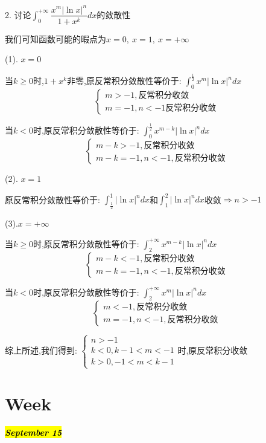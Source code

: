 2. 讨论$\int_{0}^{+\infty}\dfrac{x^m|\ln x|^n}{1+x^k}dx$的敛散性
\begin{solution}

	我们可知函数可能的暇点为$x=0,\ x=1,\ x=+\infty$
	
	(1). $x=0$
	
	当$k\geq 0$时,$1+x^{k}$非零,原反常积分敛散性等价于:  $\int_{0}^{\frac{1}{2}}x^{m}|\ln x|^ndx$
	$$\left\lbrace
	\begin{array}{l}
		m>-1,\text{反常积分收敛}\\
		m=-1,n<-1\text{反常积分收敛}
	\end{array}
	\right. $$
	
	当$k<0$时,原反常积分敛散性等价于:  $\int_{0}^{\frac{1}{2}}x^{m-k}|\ln x|^ndx$
	$$\left\lbrace
	\begin{array}{l}
		m-k>-1,\text{反常积分收敛}\\
		m-k=-1,n<-1,\text{反常积分收敛}
	\end{array}
	\right. $$
	
	(2). $x=1$
	
	原反常积分敛散性等价于:  $\int_{\frac{1}{2}}^{1}|\ln x|^ndx$和$\int_{1}^{2}|\ln x|^ndx$收敛$\Rightarrow n>-1$
	
	(3).$x=+\infty$
	
	当$k\geq 0$时,原反常积分敛散性等价于:  $\int_{2}^{+\infty}x^{m-k}|\ln x|^ndx$
	$$\left\lbrace
	\begin{array}{l}
		m-k<-1,\text{反常积分收敛}\\
		m-k=-1,n<-1,\text{反常积分收敛}
	\end{array}
	\right. $$
	
	当$k<0$时,原反常积分敛散性等价于:  $\int_{2}^{+\infty}x^{m}|\ln x|^ndx$
	$$\left\lbrace
	\begin{array}{l}
		m<-1,\text{反常积分收敛}\\
		m=-1,n<-1,\text{反常积分收敛}
	\end{array}
	\right. $$
	
	综上所述,我们得到:  $\left\lbrace
	\begin{array}{l}
		n>-1\\
		k<0,k-1<m<-1\\
		k>0,-1<m<k-1
	\end{array}
	\right. $时,原反常积分收敛
\end{solution}

\section{Week }
\hl{\textbf{\textit{September 15}}}

